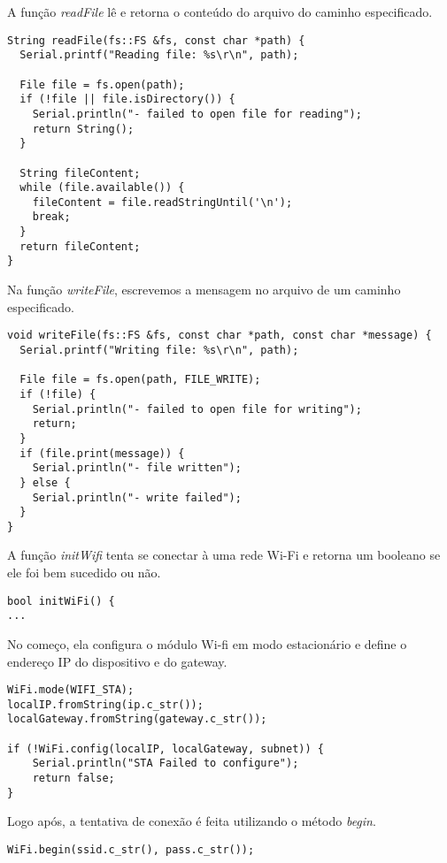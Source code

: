 A função \textit{readFile} lê e retorna o conteúdo do arquivo do caminho especificado.

\begin{lstlisting}
String readFile(fs::FS &fs, const char *path) {
  Serial.printf("Reading file: %s\r\n", path);

  File file = fs.open(path);
  if (!file || file.isDirectory()) {
    Serial.println("- failed to open file for reading");
    return String();
  }

  String fileContent;
  while (file.available()) {
    fileContent = file.readStringUntil('\n');
    break;
  }
  return fileContent;
}
\end{lstlisting}

Na função \textit{writeFile}, escrevemos a mensagem no arquivo de um caminho especificado.

\begin{lstlisting}
void writeFile(fs::FS &fs, const char *path, const char *message) {
  Serial.printf("Writing file: %s\r\n", path);

  File file = fs.open(path, FILE_WRITE);
  if (!file) {
    Serial.println("- failed to open file for writing");
    return;
  }
  if (file.print(message)) {
    Serial.println("- file written");
  } else {
    Serial.println("- write failed");
  }
}
\end{lstlisting}

A função \textit{initWifi} tenta se conectar à uma rede Wi-Fi e retorna um booleano se ele foi bem sucedido ou não.

\begin{lstlisting}
bool initWiFi() {
...
\end{lstlisting}

No começo, ela configura o módulo Wi-fi em modo estacionário e define o endereço IP do dispositivo e do gateway.

\begin{lstlisting}
WiFi.mode(WIFI_STA);
localIP.fromString(ip.c_str());
localGateway.fromString(gateway.c_str());

if (!WiFi.config(localIP, localGateway, subnet)) {
    Serial.println("STA Failed to configure");
    return false;
}
\end{lstlisting}

Logo após, a tentativa de conexão é feita utilizando o método \textit{begin}.

\begin{lstlisting}
WiFi.begin(ssid.c_str(), pass.c_str());
\end{lstlisting}

